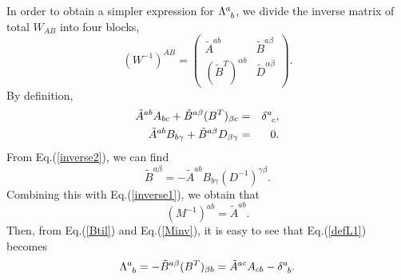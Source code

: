 In order to obtain a simpler expression for $\Lambda^a_{\sp b}$,
we divide the inverse matrix of total $W_{AB}$ into four blocks,
\begin{equation}
(W^{-1})^{AB}=\left(\begin{array}{cc}
 \tilde{A}^{ab} & \tilde{B}^{a\beta} \\
 (\tilde{B}^T)^{\alpha b} & \tilde{D}^{\alpha\beta}
\end{array}\right).
\end{equation}
By definition,
\begin{eqnarray}
   \tilde{A}^{ab}A_{bc}+\tilde{B}^{a\beta}(B^T)_{\beta c}
       &=& \delta^a_{\sp c}, \label{inverse1} \\
   \tilde{A}^{ab}B_{b\gamma}+\tilde{B}^{a\beta}
   D_{\beta\gamma} &=& 0. \label{inverse2}
\end{eqnarray}
From Eq.(\ref{inverse2}), we can find
\begin{equation}
 \tilde{B}^{a\beta}=-\tilde{A}^{ab}B_{b\gamma}
        (D^{-1})^{\gamma\beta}.
 \label{Btil}
\end{equation}
Combining this with Eq.(\ref{inverse1}),
we obtain that
\begin{equation}
  (M^{-1})^{ab}= \tilde{A}^{ab}.
\label{Minv}
\end{equation}
Then, from Eq.(\ref{Btil}) and Eq.(\ref{Minv}),
it is easy to see that Eq.(\ref{defL1}) becomes
\begin{equation}
 \Lambda^a_{\sp b}=-\tilde{B}^{a\beta}(B^T)_{\beta b}
    =\tilde{A}^{ac}A_{cb}-\delta^a_{\sp b}.
\label{defL2}
\end{equation}

